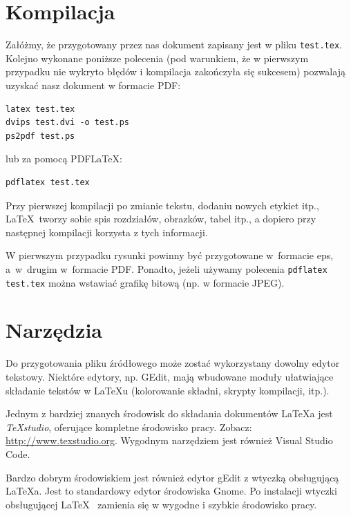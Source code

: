 
\section{Kompilacja}
\label{sec:kompilacja}


Załóżmy, że przygotowany przez nas dokument zapisany jest w pliku \texttt{test.tex}. Kolejno wykonane poniższe polecenia (pod warunkiem, że w pierwszym przypadku nie wykryto błędów i kompilacja zakończyła się sukcesem) pozwalają uzyskać nasz dokument w formacie PDF:
\begin{lstlisting}
latex test.tex
dvips test.dvi -o test.ps
ps2pdf test.ps
\end{lstlisting}
%
lub za pomocą PDF\LaTeX:
\begin{lstlisting}
pdflatex test.tex
\end{lstlisting}

Przy pierwszej kompilacji po zmianie tekstu, dodaniu nowych etykiet itp., \LaTeX~tworzy sobie spis rozdziałów, obrazków, tabel itp., a dopiero przy następnej kompilacji korzysta z tych informacji.

W pierwszym przypadku rysunki powinny być przygotowane w~formacie eps, a~w~drugim w~formacie PDF. Ponadto, jeżeli używamy polecenia \texttt{pdflatex test.tex} można wstawiać grafikę bitową (np. w formacie JPEG).




\section{Narzędzia}
\label{sec:narzedzia}


Do przygotowania pliku źródłowego może zostać wykorzystany dowolny edytor tekstowy. Niektóre edytory, np. GEdit, mają wbudowane moduły ułatwiające składanie tekstów w \LaTeX u (kolorowanie składni, skrypty kompilacji, itp.).

Jednym z bardziej znanych środowisk do składania dokumentów  \LaTeX a jest {\em TeXstudio}, oferujące kompletne środowisko pracy. Zobacz: \url{http://www.texstudio.org}. Wygodnym narzędziem jest również Visual Studio Code.

Bardzo dobrym środowiskiem jest również edytor gEdit z wtyczką obsługującą \LaTeX a. Jest to standardowy edytor środowiska Gnome. Po instalacji wtyczki obsługującej \LaTeX~ zamienia się w wygodne i szybkie środowisko pracy.

